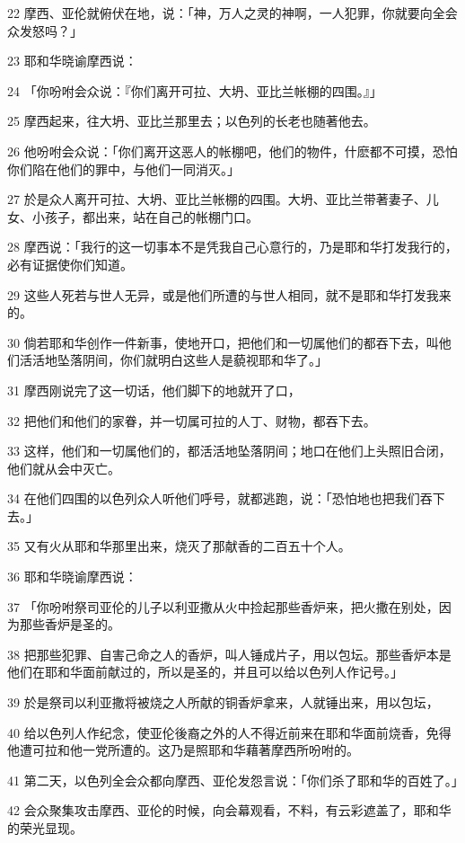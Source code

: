 \par 22 摩西、亚伦就俯伏在地，说：「神，万人之灵的神啊，一人犯罪，你就要向全会众发怒吗？」
\par 23 耶和华晓谕摩西说：
\par 24 「你吩咐会众说：『你们离开可拉、大坍、亚比兰帐棚的四围。』」
\par 25 摩西起来，往大坍、亚比兰那里去；以色列的长老也随著他去。
\par 26 他吩咐会众说：「你们离开这恶人的帐棚吧，他们的物件，什麽都不可摸，恐怕你们陷在他们的罪中，与他们一同消灭。」
\par 27 於是众人离开可拉、大坍、亚比兰帐棚的四围。大坍、亚比兰带著妻子、儿女、小孩子，都出来，站在自己的帐棚门口。
\par 28 摩西说：「我行的这一切事本不是凭我自己心意行的，乃是耶和华打发我行的，必有证据使你们知道。
\par 29 这些人死若与世人无异，或是他们所遭的与世人相同，就不是耶和华打发我来的。
\par 30 倘若耶和华创作一件新事，使地开口，把他们和一切属他们的都吞下去，叫他们活活地坠落阴间，你们就明白这些人是藐视耶和华了。」
\par 31 摩西刚说完了这一切话，他们脚下的地就开了口，
\par 32 把他们和他们的家眷，并一切属可拉的人丁、财物，都吞下去。
\par 33 这样，他们和一切属他们的，都活活地坠落阴间；地口在他们上头照旧合闭，他们就从会中灭亡。
\par 34 在他们四围的以色列众人听他们呼号，就都逃跑，说：「恐怕地也把我们吞下去。」
\par 35 又有火从耶和华那里出来，烧灭了那献香的二百五十个人。
\par 36 耶和华晓谕摩西说：
\par 37 「你吩咐祭司亚伦的儿子以利亚撒从火中捡起那些香炉来，把火撒在别处，因为那些香炉是圣的。
\par 38 把那些犯罪、自害己命之人的香炉，叫人锤成片子，用以包坛。那些香炉本是他们在耶和华面前献过的，所以是圣的，并且可以给以色列人作记号。」
\par 39 於是祭司以利亚撒将被烧之人所献的铜香炉拿来，人就锤出来，用以包坛，
\par 40 给以色列人作纪念，使亚伦後裔之外的人不得近前来在耶和华面前烧香，免得他遭可拉和他一党所遭的。这乃是照耶和华藉著摩西所吩咐的。
\par 41 第二天，以色列全会众都向摩西、亚伦发怨言说：「你们杀了耶和华的百姓了。」
\par 42 会众聚集攻击摩西、亚伦的时候，向会幕观看，不料，有云彩遮盖了，耶和华的荣光显现。
